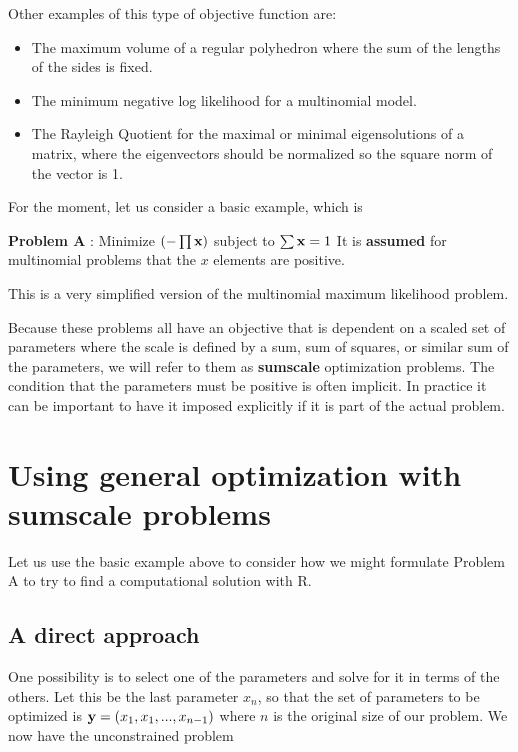 \documentclass[11pt]{article}\usepackage[]{graphicx}\usepackage[]{color}
\newcommand{\B}[1]{{\bf #1 \rm}}
\newcommand{\R}{{\sf R}}
\begin{document}
Other examples of this type of objective function are:

\begin{itemize}
\item{The maximum volume  of a regular polyhedron where the sum of the lengths
of the sides is fixed.}
\item{The minimum negative log likelihood for a multinomial model.}
\item{The Rayleigh Quotient for the maximal or minimal eigensolutions of a matrix, where
the eigenvectors should be normalized so the square norm of the vector is 1.}
\end{itemize}

For the moment, let us consider a basic example, which is 
\vspace*{10pt}

\B{Problem A}: Minimize  $( - \prod{\B{x}})$ subject to $\sum{\B{x}}=1$
It is \textbf{assumed} for multinomial problems that the $x$ elements are positive.
\vspace*{10pt}

This is a very simplified version of the multinomial maximum likelihood problem. 

Because these problems all have an objective that is dependent on a scaled set of parameters 
where the scale is defined by a sum, sum of squares, or similar sum of the parameters, we will
refer to them as \B{sumscale} optimization problems. The condition that the parameters
must be positive is often implicit. In practice it can be important to have it imposed
explicitly if it is part of the actual problem. 

\section{Using general optimization with sumscale problems}

Let us use the basic example above to consider how we might formulate Problem A to try
to find a computational solution with \R. 

\subsection{A direct approach}

One possibility is to select one of the parameters and solve for it in 
terms of the others. Let this
be the last parameter $x_n$, so that the set of parameters to be 
optimized is $ \B{y} = (x_1, x_1, ..., x_{n-1})$ where 
$n$ is the original size of our problem. We now have the unconstrained problem
\vspace*{10pt}
\end{document}
